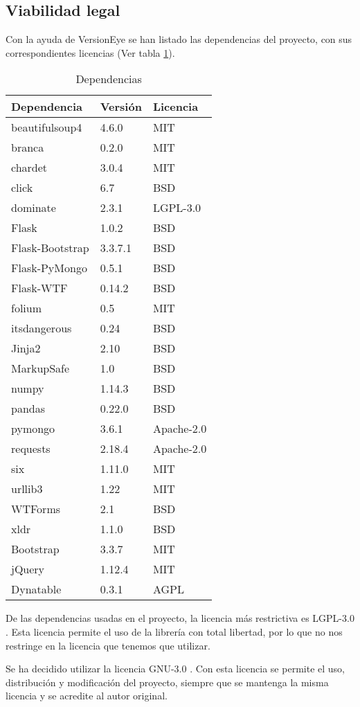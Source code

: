 \subsection{Viabilidad legal}

Con la ayuda de VersionEye \cite{misc:versioneye} se han listado las dependencias del proyecto, con sus correspondientes licencias (Ver tabla \ref{tab:dependencias}). 

\begin{table}[]
	\centering
	\begin{tabular}{lll}
		\hline
		Dependencia & Versión & Licencia \\ \hline
		beautifulsoup4 & 4.6.0 & MIT \\
		branca & 0.2.0& MIT \\
		chardet & 3.0.4 & MIT \\
		click & 6.7 & BSD \\
		dominate & 2.3.1 & LGPL-3.0 \\
		Flask & 1.0.2 & BSD \\
		Flask-Bootstrap & 3.3.7.1 & BSD \\
		Flask-PyMongo & 0.5.1 & BSD \\
		Flask-WTF & 0.14.2 & BSD \\
		folium & 0.5 & MIT \\
		itsdangerous & 0.24 & BSD \\
		Jinja2 & 2.10 & BSD \\
		MarkupSafe & 1.0 & BSD \\
		numpy & 1.14.3 & BSD \\
		pandas & 0.22.0 & BSD \\
		pymongo & 3.6.1 & Apache-2.0 \\
		requests & 2.18.4 & Apache-2.0 \\
		six & 1.11.0 & MIT \\
		urllib3 & 1.22 & MIT \\
		WTForms & 2.1 & BSD \\
		xldr & 1.1.0 & BSD \\
		Bootstrap & 3.3.7 & MIT \\
		jQuery & 1.12.4 & MIT \\
		Dynatable & 0.3.1 & AGPL \\
		\bottomrule
	\end{tabular}
	\caption{Dependencias}
	\label{tab:dependencias}
\end{table}

De las dependencias usadas en el proyecto, la licencia más restrictiva es LGPL-3.0 \cite{misc:lgpl}. Esta licencia permite el uso de la librería con total libertad, por lo que no nos restringe en la licencia que tenemos que utilizar.

Se ha decidido utilizar la licencia GNU-3.0 \cite{misc:gnu3}. Con esta licencia se permite el uso, distribución y modificación del proyecto, siempre que se mantenga la misma licencia y se acredite al autor original.
